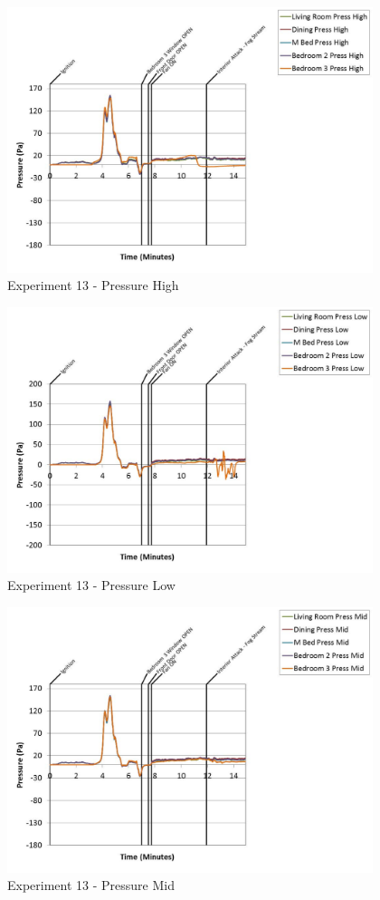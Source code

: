 \documentclass{article}
\begin{document}
\begin{appendices}
	\clearpage

	\begin{figure}[h!]
		\centering
		\includegraphics[height=3.05in]{0_Images/Results_Charts/Exp_13_Charts/PressureHigh.pdf}
		\caption{Experiment 13 - Pressure High}
	\end{figure}
 

	\begin{figure}[h!]
		\centering
		\includegraphics[height=3.05in]{0_Images/Results_Charts/Exp_13_Charts/PressureLow.pdf}
		\caption{Experiment 13 - Pressure Low}
	\end{figure}
 
	\clearpage

	\begin{figure}[h!]
		\centering
		\includegraphics[height=3.05in]{0_Images/Results_Charts/Exp_13_Charts/PressureMid.pdf}
		\caption{Experiment 13 - Pressure Mid}
	\end{figure}
 


\end{appendices}
\end{document}
